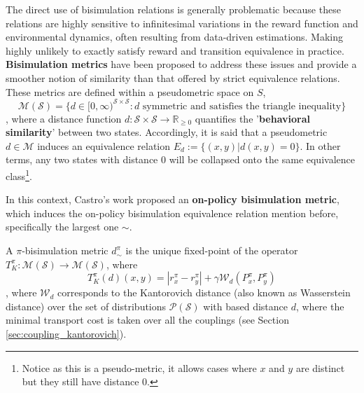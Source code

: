 The direct use of bisimulation relations is generally problematic because these relations are highly sensitive to infinitesimal variations in the reward function and environmental dynamics, often resulting from data-driven estimations. Making highly unlikely to exactly satisfy reward and transition equivalence in practice. \textbf{Bisimulation metrics} \cite{ferns2004metrics, ferns2011bisimulation, ferns2014bisimulation, castro2020scalable} have been proposed to address these issues and provide a smoother notion of similarity than that offered by strict equivalence relations. These metrics are defined within a pseudometric space on $S$, 
\begin{equation}
\mathcal{M(S)}= \{d \in [0, \infty)^{\mathcal{S} \times \mathcal{S}} : d \text{ symmetric and satisfies the triangle inequality}\}
\end{equation}
, where a distance function \(d : \mathcal{S} \times \mathcal{S} \rightarrow \mathbb{R}_{\geq 0}\) quantifies the '\textbf{behavioral similarity}' between two states. Accordingly, it is said that a pseudometric $d \in \mathcal{M}$ induces an equivalence relation $E_d := \{(x, y)|d(x, y) = 0\}$. In other terms, any two states with distance 0 will be collapsed onto the same equivalence class\footnote{Notice as this is a pseudo-metric, it allows cases where $x$ and $y$ are distinct but they still have distance 0.}.

In this context, Castro's work \cite{castro2020scalable} proposed an \textbf{on-policy bisimulation metric}, which induces the on-policy bisimulation equivalence relation mention before, specifically the largest one $\sim$.

\begin{definition}
A $\pi$-bisimulation metric $d^\pi_\sim$ is the unique fixed-point of the operator $T^\pi_K : \mathcal{M(S)} \rightarrow \mathcal{M(S)}$, where 
\begin{equation}
    \label{eq:on_policy_bisim_metric}
    T^\pi_K(d)(x, y) = |r^\pi_x - r^\pi_y| + \gamma \mathcal{W}_d(P^\pi_x,P^\pi_y) 
\end{equation}
, where $\mathcal{W}_d$ corresponds to the Kantorovich distance (also known as Wasserstein distance) over the set of distributions $\mathcal{P}(\mathcal{S})$ with based distance $d$, where the minimal transport cost is taken over all the couplings (see Section \ref{sec:coupling_kantorovich}).
\end{definition}

